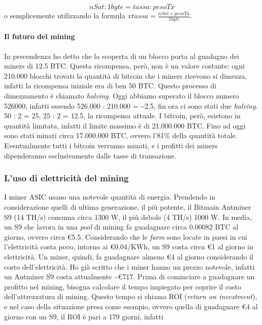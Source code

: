 \documentclass {article}
\begin{document}
$$ nSat : 1 byte = tassa : pesoTx $$
%
o semplicemente utilizzando la formula $x tassa = \frac{nSat \times pesoTx}{1 byte}$.

\paragraph {Il futuro del mining}

In precendenza ho detto che la scoperta di un blocco porta al guadagno dei miners di 12.5 BTC.
Questa ricompensa, però, non è un valore costante: ogni 210.000 blocchi trovati la quantità di bitcoin che i miners ricevono si dimezza, infatti la ricompensa iniziale era di ben 50 BTC. Questo processo di dimezzamento è chiamato \textit{halving}.
Oggi abbiamo superato il blocco numero 526000, infatti essendo 526.000 : 210.000 = \textasciitilde 2.5, fin ora ci sono stati due \textit{halving}.
50 : 2 = 25, 25 : 2 = 12.5, la ricompensa attuale.
I bitcoin, però, esistono in quantità limitata, infatti il limite massimo è di 21.000.000 BTC.
Fino ad oggi sono stati minati circa 17.000.000 BTC, ovvero l'81\% della quantità totale.
Eventualmente tutti i bitcoin verranno minati, e i profitti dei miners dipenderanno esclusivamente dalle tasse di transazione.


\subsubsection {L'uso di elettricità del mining}


I miner ASIC usano una notevole quantità di energia. Prendendo in considerazione quelli di ultima generazione, il più potente, il Bitmain Antminer S9 (14 TH/s) consuma circa 1300 W, il più debole (4 TH/s) 1000 W.
In media, un S9 che lavora in una \textit{pool} di mining fa guadagnare circa 0.00082 BTC al giorno, ovvero circa \euro{5.5}.
Considerando che le \textit{farm} sono locate in paesi in cui l'elettricità costa poco, intorno ai \euro{0.04}/KWh, un S9 costa circa \euro{1} al giorno in elettricità.
Un miner, quindi, fa guadagnare almeno \euro{4} al giorno considerando il costo dell'elettricità.
Ho già scritto che i miner hanno un prezzo notevole, infatti un Antminer S9 costa attualmente \textasciitilde \euro{717}.
Prima di cominciare a guadagnare un profitto nel mining, bisogna calcolare il tempo impiegato per coprire il costo dell'attrezzatura di mining.
Questo tempo si chiama ROI (\textit{return on investment}), e nel caso della situazione presa come esempio, ovvero quella di guadagnare \euro{4} al giorno con un S9, il ROI è pari a 179 giorni, infatti
\end{document}
